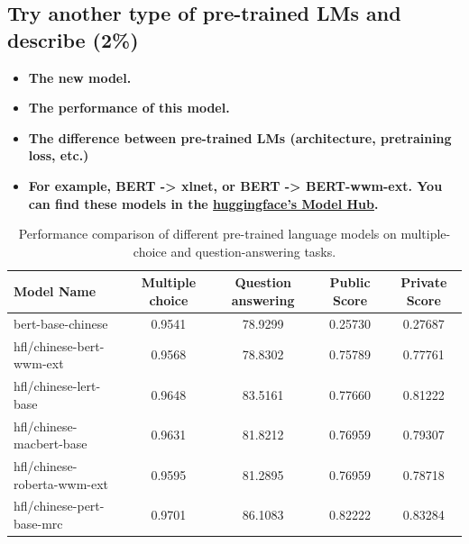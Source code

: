 \documentclass{article}
\begin{document}
\subsection{Try another type of pre-trained LMs and describe (2\%)}
\begin{itemize}
    \item \textbf{The new model.}
    \item \textbf{The performance of this model.}
    \item \textbf{The difference between pre-trained LMs (architecture, pretraining loss, etc.)}
    \item \textbf{For example, BERT -> xlnet, or BERT -> BERT-wwm-ext. You can find these models in the \href{https://huggingface.co/models?search=chinese}{huggingface's Model Hub}.}
\end{itemize}

\vspace{5em}

\begin{table}[h]
    \centering
    \small
    \setlength{\tabcolsep}{6pt}
    \caption{Performance comparison of different pre-trained language models on multiple-choice and question-answering tasks.}
    \begin{tabular}{lcccc}
        \toprule
        \textbf{Model Name}         & \textbf{Multiple choice} & \textbf{Question answering} & \textbf{Public Score} & \textbf{Private Score} \\
        \midrule
        bert-base-chinese           & 0.9541                   & 78.9299                     & 0.25730               & 0.27687                \\
        hfl/chinese-bert-wwm-ext    & 0.9568                   & 78.8302                     & 0.75789               & 0.77761                \\
        hfl/chinese-lert-base       & 0.9648                   & 83.5161                     & 0.77660               & 0.81222                \\
        hfl/chinese-macbert-base    & 0.9631                   & 81.8212                     & 0.76959               & 0.79307                \\
        hfl/chinese-roberta-wwm-ext & 0.9595                   & 81.2895                     & 0.76959               & 0.78718                \\
        hfl/chinese-pert-base-mrc   & 0.9701                   & 86.1083                     & 0.82222               & 0.83284                \\
        \bottomrule
    \end{tabular}
    \label{tab:model_performance}
\end{table}
\end{document}
